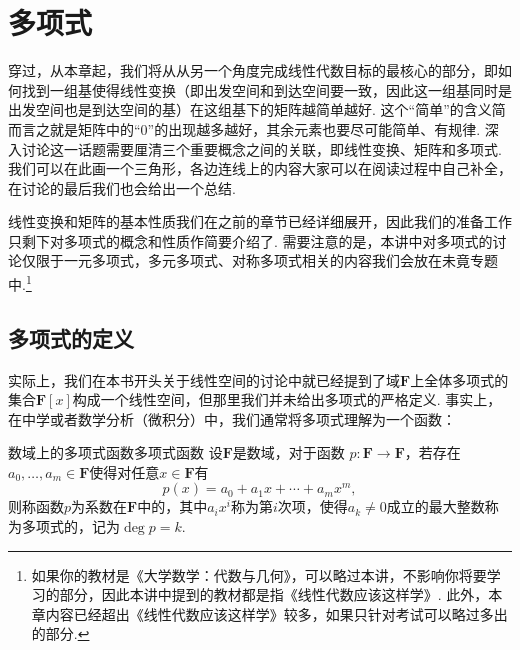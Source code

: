 \chapter{多项式}

穿过，从本章起，我们将从从另一个角度完成线性代数目标的最核心的部分，即如何找到一组基使得线性变换（即出发空间和到达空间要一致，因此这一组基同时是出发空间也是到达空间的基）在这组基下的矩阵越简单越好. 这个``简单''的含义简而言之就是矩阵中的``0''的出现越多越好，其余元素也要尽可能简单、有规律. 深入讨论这一话题需要厘清三个重要概念之间的关联，即线性变换、矩阵和多项式. 我们可以在此画一个三角形，各边连线上的内容大家可以在阅读过程中自己补全，在讨论的最后我们也会给出一个总结.

\begin{figure}[H]
    \centering
\end{figure}

线性变换和矩阵的基本性质我们在之前的章节已经详细展开，因此我们的准备工作只剩下对多项式的概念和性质作简要介绍了. 需要注意的是，本讲中对多项式的讨论仅限于一元多项式，多元多项式、对称多项式相关的内容我们会放在未竟专题中.\footnote{如果你的教材是《大学数学：代数与几何》，可以略过本讲，不影响你将要学习的部分，因此本讲中提到的教材都是指《线性代数应该这样学》. 此外，本章内容已经超出《线性代数应该这样学》较多，如果只针对考试可以略过多出的部分.}

\section{多项式的定义}

实际上，我们在本书开头关于线性空间的讨论中就已经提到了域$\mathbf{F}$上全体多项式的集合$\mathbf{F}[x]$构成一个线性空间，但那里我们并未给出多项式的严格定义. 事实上，在中学或者数学分析（微积分）中，我们通常将多项式理解为一个函数：
\begin{definition}{数域上的多项式函数}{多项式函数} 
    设$\mathbf{F}$是数域，对于函数 $p\colon \mathbf{F}\to\mathbf{F}$，若存在$a_0,\ldots,a_m\in\mathbf{F}$使得对任意$x\in\mathbf{F}$有
    \begin{equation}
        p(x)=a_0+a_1x+\cdots+a_mx^m,
    \end{equation}
    则称函数$p$为系数在$\mathbf{F}$中的，其中$a_ix^i$称为第$i$次项，使得$a_k\neq 0$成立的最大整数称为多项式的，记为$\deg p=k$.
\end{definition}

